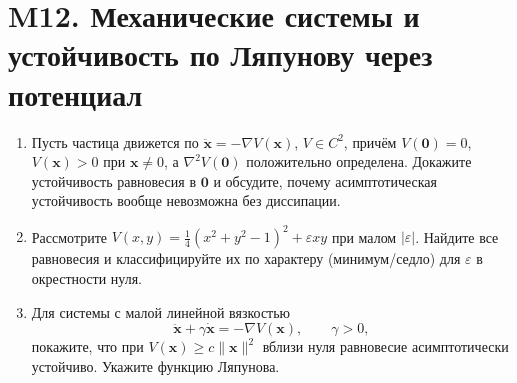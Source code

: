 \documentclass[12pt]{article}
\begin{document}
\section*{M12. Механические системы и устойчивость по Ляпунову через потенциал}
\begin{enumerate}
\item Пусть частица движется по $\ddot{\mathbf x}=-\nabla V(\mathbf x)$, $V\in C^2$, причём $V(\mathbf 0)=0$, $V(\mathbf x)>0$ при $\mathbf x\ne 0$, а $\nabla^2 V(\mathbf 0)$ положительно определена. Докажите устойчивость равновесия в $\mathbf 0$ и обсудите, почему асимптотическая устойчивость вообще невозможна без диссипации.

\item Рассмотрите $V(x,y)=\tfrac14(x^2+y^2-1)^2+\varepsilon xy$ при малом $|\varepsilon|$. Найдите все равновесия и классифицируйте их по характеру (минимум/седло) для $\varepsilon$ в окрестности нуля.

\item Для системы с малой линейной вязкостью
\[
\ddot{\mathbf x}+\gamma \dot{\mathbf x} = -\nabla V(\mathbf x),\qquad \gamma>0,
\]
покажите, что при $V(\mathbf x)\ge c\|\mathbf x\|^2$ вблизи нуля равновесие асимптотически устойчиво. Укажите функцию Ляпунова.
\end{enumerate}

\end{document}
